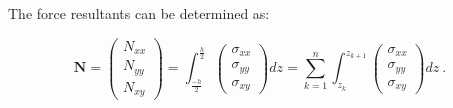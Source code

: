 The force resultants can be determined as:

\begin{equation}
\mathbf{N} = 
\begin{pmatrix}
N_{xx} \\
N_{yy} \\
N_{xy} 
\end{pmatrix}
=
{\int_{\frac{-h}{2}}^{\frac{h}{2}}
	\begin{pmatrix}
	\sigma_{xx} \\
	\sigma_{yy} \\
	\sigma_{xy} 
	\end{pmatrix}}
dz
=
\sum_{k=1}^n
\int_{z_k}^{z_{k+1}}
	\begin{pmatrix}
	\sigma_{xx} \\
	\sigma_{yy} \\
	\sigma_{xy} 
	\end{pmatrix}
dz
\label{eqscomp_laminate_constitutive1}\ .
\end{equation}

